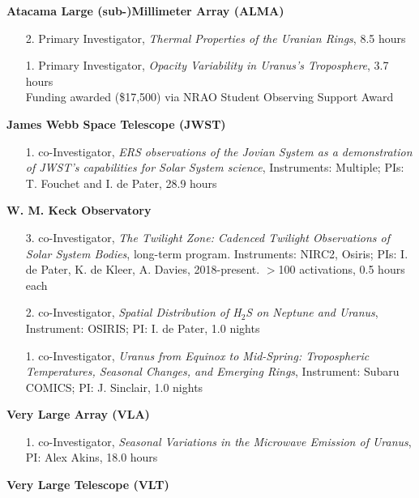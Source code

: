 \documentclass[margin, 10pt]{res} %
\begin{document}
\begin{resume}

\textbf{Atacama Large (sub-)Millimeter Array (ALMA)} 
\begin{enumerate}
	\item[2.] Primary Investigator, {\it Thermal Properties of the Uranian Rings}, 8.5 hours %
	\item[1.] Primary Investigator, {\it Opacity Variability in Uranus's Troposphere}, 3.7 hours \\ Funding awarded (\$17,500) via NRAO Student Observing Support Award %
\end{enumerate}
\vspace{-0.3cm}
\textbf{James Webb Space Telescope (JWST)} 
\begin{enumerate}
	\item[1.] co-Investigator, {\it ERS observations of the Jovian System as a demonstration of JWST's capabilities for Solar System science}, Instruments: Multiple; PIs: T. Fouchet and I. de Pater, 28.9 hours %
\end{enumerate}
\vspace{-0.3cm}
\textbf{W. M. Keck Observatory} 
\begin{enumerate}
	\item[3.] co-Investigator, {\it The Twilight Zone: Cadenced Twilight Observations of Solar System Bodies}, long-term program. Instruments: NIRC2, Osiris; PIs: I. de Pater, K. de Kleer, A. Davies, 2018-present. $>$100 activations, 0.5 hours each %
	\item[2.] co-Investigator, {\it Spatial Distribution of H$_2$S on Neptune and Uranus}, Instrument: OSIRIS; PI: I. de Pater, 1.0 nights %
	\item[1.] co-Investigator, {\it Uranus from Equinox to Mid-Spring: Tropospheric Temperatures, Seasonal Changes, and Emerging Rings}, Instrument: Subaru COMICS; PI: J. Sinclair, 1.0 nights %
\end{enumerate}
\vspace{-0.3cm}
\textbf{Very Large Array (VLA)}
\begin{enumerate}
	\item[1.] co-Investigator, {\it Seasonal Variations in the Microwave Emission of Uranus}, PI: Alex Akins, 18.0 hours %
\end{enumerate}
\vspace{-0.3cm}
\textbf{Very Large Telescope (VLT)} 
\begin{enumerate}

\end{enumerate}
\end{resume}
\end{document}
